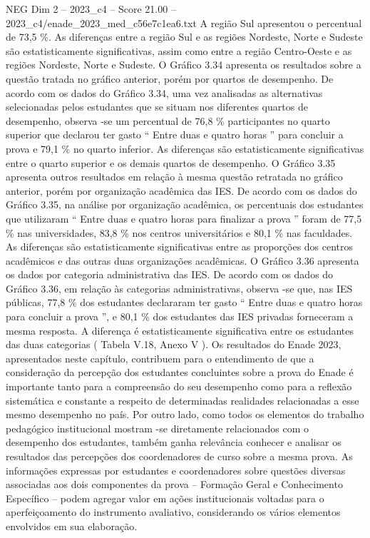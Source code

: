 \begin{textsample}{NEG Dim 2 – 2023\_c4 – Score 21.00 – 2023\_c4/enade\_2023\_med\_c56e7c1ea6.txt}
A região Sul apresentou o percentual de 73,5 \%.
As diferenças entre a região Sul e as regiões Nordeste, Norte e Sudeste são estatisticamente significativas, assim como entre a região Centro-Oeste e as regiões Nordeste, Norte e Sudeste.
O Gráfico 3.34 apresenta os resultados sobre a questão tratada no gráfico anterior, porém por quartos de desempenho.
De acordo com os dados do Gráfico 3.34, uma vez analisadas as alternativas selecionadas pelos estudantes que se situam nos diferentes quartos de desempenho, observa -se um percentual de 76,8 \% participantes no quarto superior que declarou ter gasto “ Entre duas e quatro horas ” para concluir a prova e 79,1 \% no quarto inferior.
As diferenças são estatisticamente significativas entre o quarto superior e os demais quartos de desempenho.
O Gráfico 3.35 apresenta outros resultados em relação à mesma questão retratada no gráfico anterior, porém por organização acadêmica das IES.
De acordo com os dados do Gráfico 3.35, na análise por organização acadêmica, os percentuais dos estudantes que utilizaram “ Entre duas e quatro horas para finalizar a prova ” foram de 77,5 \% nas universidades, 83,8 \% nos centros universitários e 80,1 \% nas faculdades.
As diferenças são estatisticamente significativas entre as proporções dos centros acadêmicos e das outras duas organizações acadêmicas.
O Gráfico 3.36 apresenta os dados por categoria administrativa das IES.
De acordo com os dados do Gráfico 3.36, em relação às categorias administrativas, observa -se que, nas IES públicas, 77,8 \% dos estudantes declararam ter gasto “ Entre duas e quatro horas para concluir a prova ”, e 80,1 \% dos estudantes das IES privadas forneceram a mesma resposta.
A diferença é estatisticamente significativa entre os estudantes das duas categorias ( Tabela V.18, Anexo V ).
Os resultados do Enade 2023, apresentados neste capítulo, contribuem para o entendimento de que a consideração da percepção dos estudantes concluintes sobre a prova do Enade é importante tanto para a compreensão do seu desempenho como para a reflexão sistemática e constante a respeito de determinadas realidades relacionadas a esse mesmo desempenho no país.
Por outro lado, como todos os elementos do trabalho pedagógico institucional mostram -se diretamente relacionados com o desempenho dos estudantes, também ganha relevância conhecer e analisar os resultados das percepções dos coordenadores de curso sobre a mesma prova.
As informações expressas por estudantes e coordenadores sobre questões diversas associadas aos dois componentes da prova – Formação Geral e Conhecimento Específico – podem agregar valor em ações institucionais voltadas para o aperfeiçoamento do instrumento avaliativo, considerando os vários elementos envolvidos em sua elaboração.

\end{textsample}
